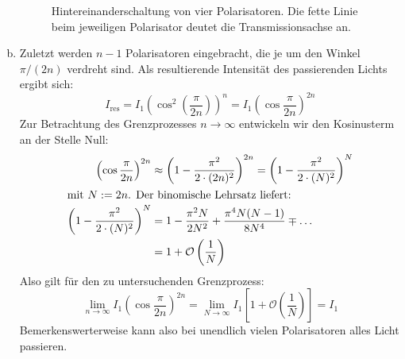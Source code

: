 \begin{enumerate}[(a)]
\begin{figure}[htbp]
\caption{Hintereinanderschaltung von vier Polarisatoren. Die fette Linie beim jeweiligen Polarisator deutet die Transmissionsachse an.}
\label{fig:polar4}
\end{figure}
\item Zuletzt werden $n-1$ Polarisatoren eingebracht, die je um den Winkel $\pi/(2n)$ verdreht sind. Als resultierende Intensität des passierenden Lichts ergibt sich:
\begin{equation}
I_\text{res} = I_1 \left(\cos^2{\left(\frac{\pi}{2n}\right)}\right)^n = I_1 \left( \cos\frac{\pi}{2n} \right)^{2n}
\end{equation}
Zur Betrachtung des Grenzprozesses $n\to \infty$ entwickeln wir den Kosinusterm an der Stelle Null:
\begin{align}
\left(\cos{\frac{\pi}{2n}}\right)^{2n} &\approx \left(1-\frac{\pi^2}{2\cdot (2n)^2}\right)^{2n} = \left(1-\frac{\pi^2}{2\cdot (N)^2}\right)^{N} \\
\intertext{mit $N:=2n$. Der binomische Lehrsatz liefert:}
\left(1-\frac{\pi^2}{2\cdot (N)^2}\right)^{N} &= 1- \frac{\pi^2 N}{2 N^2} +\frac{\pi^4 N(N-1)}{8 N^4} \mp \dots \\
&= 1+ \mathcal{O}\left(\frac{1}{N}\right)
\end{align}
Also gilt für den zu untersuchenden Grenzprozess:
\begin{equation}
\lim_{n\to\infty} I_1 \left( \cos\frac{\pi}{2n} \right)^{2n} = \lim_{N\to\infty} I_1\left[1+ \mathcal{O}\left(\frac{1}{N}\right) \right] =I_1
\end{equation}
Bemerkenswerterweise kann also bei unendlich vielen Polarisatoren alles Licht passieren.
\end{enumerate}